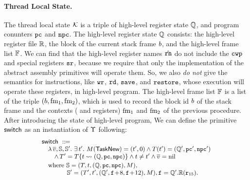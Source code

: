 \paragraph{\textbf{Thread Local State.}} 
The thread local state $\mathcal{K}$ 
is a triple of high-level register state $\mathbb{Q}$, 
and program conunters $\texttt{pc}$ and $\texttt{npc}$. The high-level 
register state $\mathbb{Q}$ consists: 
the high-level register file $\mathbb{R}$, 
the block of the current stack frame $b$, 
and the high-level frame list $\mathbb{F}$. 
We can find that the high-level register names $\hat{\texttt{rn}}$ 
do not include the $\texttt{cwp}$ and special registers 
$\texttt{sr}$, because we require that only the implementation 
of the abstract assembly primitives will operate them. 
So, we also {\it do not} give the semantics for instructions,
like $\texttt{wr}$, $\texttt{rd}{}$, $\texttt{save}{}$, and $\texttt{restore}{}$, 
whose  execution will operate these registers, 
in high-level program. 
The high-level frame list $\mathbb{F}$ is a list of the triple 
$(b, \text{fm}_1, \text{fm}_2)$, which is used to record 
the block id $b$ of the stack frame and  
the contexts (\localRN{} and \inRN{} registers) 
$\text{fm}_1$ and $\text{fm}_2$ of the previous procedure.
After introducing the state of high-level program, 
We can define the primitive $\mathsf{switch}$ as 
an instantiation of $\Upsilon$ following: 
\[
    \small
    \begin{array}{l}
        \primsw \ \define \\
        \quad 
        \lambda \, \args{\val}, \hpstate, \hpstate'. \ 
        \exists \, \thrdid'. \ 
        \Mem(\TaskNew) = (\thrdid', 0) \land 
        \thrdpool(\thrdid') = 
            (\hRstate', \pc', \npc') \\
        \qquad
        \land \,
        \thrdpool' = \thrdpool\{ \thrdid \rightsquigarrow 
            (\hRstate, \pc, \npc) \} 
            \land \tid \neq \tid' \land \args{\val} = \nil \\
        \\[-9pt]
        \quad \text{where} \ 
        \hpstate = 
            (\thrdpool, \thrdid, (\hRstate, \pc, \npc), \Mem), \\
        \qquad\qquad
        \hpstate' = 
            (\thrdpool', \thrdid', 
                (\hRstate', \lab{}\!+\!8, \lab{}\!+\!12), \Mem), 
                \lab{} = \hRstate'.\hRfile(\reg{15}). 
    \end{array}
\]
